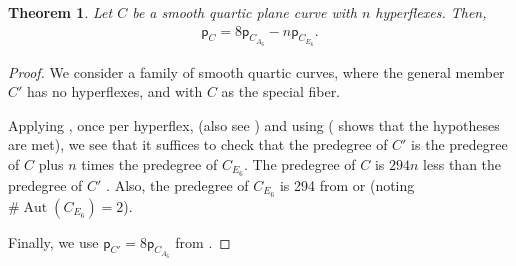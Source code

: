 \documentclass[12 pt, reqno]{amsart}
\newtheorem{thm}{Theorem}[section]
\theoremstyle{definition}
\newcommand{\on}{\operatorname}
\newcommand{\mb}{\mathbb}
\newcommand{\mc}{\mathcal}
\newcommand{\wt}{\widetilde}
\newcommand{\p}{\mathsf{p}}
\begin{document}

\begin{thm}
\label{allsmooth}
Let $C$ be a smooth quartic plane curve with $n$ hyperflexes. Then,
\begin{align*}
 \p_C = 8\p_{C_{A_6}}-n\p_{C_{E_6}}.
\end{align*}
\end{thm}

\begin{proof}
  We consider a family of smooth quartic curves, where the general
  member $C'$ has no hyperflexes, and with $C$ as the special fiber.

  Applying , once per hyperflex, (also see
  ) and using  (
  shows that the hypotheses are met), we see that it suffices to check
  that the predegree of $C'$ is the predegree of $C$ plus $n$ times
  the predegree of $C_{E_6}$. The predegree of $C$ is $294n$ less than
  the predegree of $C'$ \cite[Section 3.6]{AF93}. Also, the predegree
  of $C_{E_6}$ is 294 from \cite[bottom of page 36]{AF00} or
   (noting $\#\on{Aut}(C_{E_6})=2$).

  Finally, we use $\p_{C'}=8\p_{C_{A_6}}$ from .
\end{proof}
\end{document}
